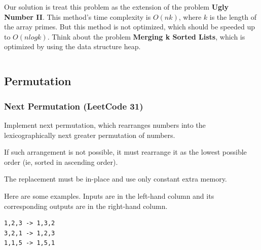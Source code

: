 \documentclass[11pt]{article}
\begin{document}
Our solution is treat this problem as the extension of the problem \textbf{Ugly Number II}. 
This method's time complexity is $O(nk)$, where $k$ is the length of the array primes. 
But this method is not optimized, which should be speeded up to $O(n log k)$. 
Think about the problem \textbf{Merging k Sorted Lists}, which is optimized by using the data structure heap. 

\inputminted[breaklines=true,frame=leftline, linenos=true]{python}{src/nthSuperUglyNumber.py}

\subsection{Permutation}
\subsubsection{Next Permutation (LeetCode 31)}
Implement next permutation, which rearranges numbers into the lexicographically next greater permutation of numbers.

If such arrangement is not possible, it must rearrange it as the lowest possible order (ie, sorted in ascending order).

The replacement must be in-place and use only constant extra memory.

Here are some examples. Inputs are in the left-hand column and its corresponding outputs are in the right-hand column.
\begin{verbatim}
1,2,3 -> 1,3,2
3,2,1 -> 1,2,3
1,1,5 -> 1,5,1	
\end{verbatim}
\end{document}

